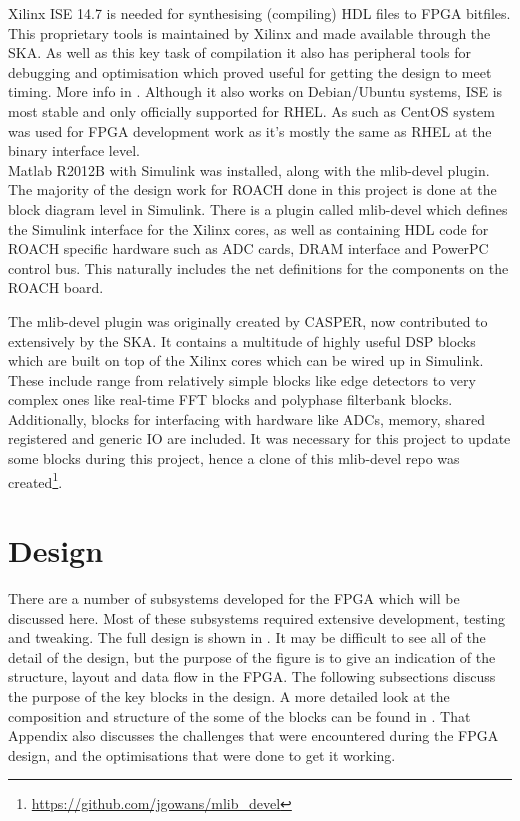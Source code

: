 Xilinx ISE 14.7 is needed for synthesising (compiling) HDL files to FPGA bitfiles. This proprietary tools is maintained by Xilinx and made available through the SKA. As well as this key task of compilation it also has peripheral tools for debugging and optimisation which proved useful for getting the design to meet timing. More info in . Although it also works on Debian/Ubuntu systems, ISE is most stable and only officially supported for RHEL. As such as CentOS system was used for FPGA development work as it's mostly the same as RHEL at the binary interface level.\\

Matlab R2012B with Simulink was installed, along  with the mlib-devel plugin. The majority of the design work for ROACH done in this project is done at the block diagram level in Simulink. There is a plugin called mlib-devel which defines the Simulink interface for the Xilinx cores, as well as containing HDL code for ROACH specific hardware such as ADC cards, DRAM interface and PowerPC control bus. This naturally includes the net definitions for the components on the ROACH board.

The mlib-devel plugin was originally created by CASPER, now contributed to extensively by the SKA. It contains a multitude of highly useful DSP blocks which are built on top of the Xilinx cores which can be wired up in Simulink. These include range from relatively simple blocks like edge detectors to very complex ones like real-time FFT blocks and polyphase filterbank blocks. Additionally, blocks for interfacing with hardware like ADCs, memory, shared registered and generic IO are included. It was necessary for this project to update some blocks during this project, hence a clone of this mlib-devel repo was created\footnote{\url{https://github.com/jgowans/mlib_devel}}.


\section{Design}
There are a number of subsystems developed for the FPGA which will be discussed here. Most of these subsystems required extensive development, testing and tweaking. The full design is shown in . It may be difficult to see all of the detail of the design, but the purpose of the figure is to give an indication of the structure, layout and data flow in the FPGA. The following subsections discuss the purpose of the key blocks in the design. A more detailed look at the composition and structure of the some of the blocks can be found in . That Appendix also discusses the challenges that were encountered during the FPGA design, and the optimisations that were done to get it working.

